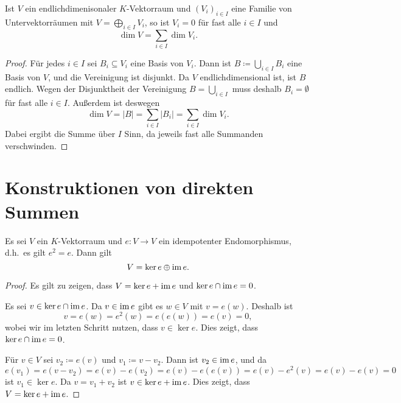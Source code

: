 \documentclass[a4paper,10pt]{scrartcl}
\begin{document}
\begin{corollary}
  Ist $V$ ein endlichdimenisonaler $K$-Vektorraum und $(V_i)_{i \in I}$ eine Familie von Untervektorräumen mit $V = \bigoplus_{i \in I} V_i$, so ist $V_i = 0$ für fast alle $i \in I$ und
  \[
      \dim V
    = \sum_{i \in I} \dim V_i.
  \]
\end{corollary}
\begin{proof}
  Für jedes $i \in I$ sei $B_i \subseteq V_i$ eine Basis von $V_i$.
  Dann ist $B \coloneqq \bigcup_{i \in I} B_i$ eine Basis von $V$, und die Vereinigung ist disjunkt.
  Da $V$ endlichdimensional ist, ist $B$ endlich.
  Wegen der Disjunktheit der Vereinigung $B = \bigcup_{i \in I}$ muss deshalb $B_i = \emptyset$ für fast alle $i \in I$.
  Außerdem ist deswegen
  \[
      \dim V
    = |B|
    = \sum_{i \in I} |B_i|
    = \sum_{i \in I} \dim V_i.
  \]
  Dabei ergibt die Summe über $I$ Sinn, da jeweils fast alle Summanden verschwinden.
\end{proof}












\section{Konstruktionen von direkten Summen}


\begin{proposition}
  Es sei $V$ ein $K$-Vektorraum und $e \colon V \to V$ ein idempotenter Endomorphismus, d.h.\ es gilt $e^2 = e$.
  Dann gilt
  \[
    V = \ker e \oplus \operatorname{im} e.
  \]
\end{proposition}


\begin{proof}
  Es gilt zu zeigen, dass $V = \ker e + \operatorname{im} e$ und $\ker e \cap \operatorname{im} e = 0$.
  
  Es sei $v \in \ker e \cap \operatorname{im} e$.
  Da $v \in \operatorname{im} e$ gibt es $w \in V$ mit $v = e(w)$.
  Deshalb ist
  \[
    v
    = e(w)
    = e^2(w)
    = e(e(w))
    = e(v)
    = 0,
  \]
  wobei wir im letzten Schritt nutzen, dass $v \in \ker e$.
  Dies zeigt, dass $\ker e \cap \operatorname{im} e = 0$.
  
  Für $v \in V$ sei $v_2 \coloneqq e(v)$ und $v_1 \coloneqq v - v_2$.
  Dann ist $v_2 \in \operatorname{im} e$, und da
  \[
      e(v_1)
    = e(v - v_2)
    = e(v) - e(v_2)
    = e(v) - e(e(v))
    = e(v) - e^2(v)
    = e(v) - e(v)
    = 0
  \]
  ist $v_1 \in \ker e$.
  Da $v = v_1 + v_2$ ist $v \in \ker e + \operatorname{im} e$.
  Dies zeigt, dass $V = \ker e + \operatorname{im} e$.
\end{proof}




\end{document}
